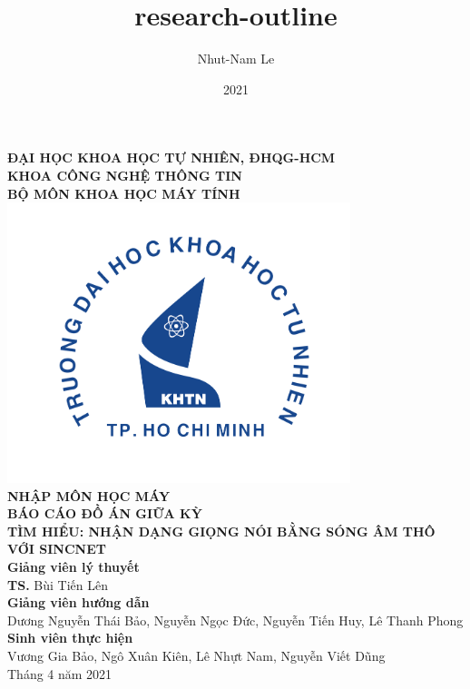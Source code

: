\documentclass{article}
\title{research-outline}
\author{Nhut-Nam Le}
\date{2021}
\newcommand\B{\rule[-1.2ex]{0pt}{0pt}} %
\begin{document}
	\begin{titlepage}
		\begin{center}
			\large{\textbf{ĐẠI HỌC KHOA HỌC TỰ NHIÊN, ĐHQG-HCM\\KHOA CÔNG NGHỆ THÔNG TIN\\BỘ MÔN KHOA HỌC MÁY TÍNH}}\\
			\includegraphics[width=0.75\textwidth]{images/khtn.png}\\
			\large \textbf{NHẬP MÔN HỌC MÁY}\\[0.1in]
			\huge \textbf{BÁO CÁO ĐỒ ÁN GIỮA KỲ}\\[0.1in]
			\huge \textbf{TÌM HIỂU: NHẬN DẠNG GIỌNG NÓI BẰNG SÓNG ÂM THÔ VỚI SINCNET}\\[0.1in]
			\vfill
			\normalsize
			\normalsize
			\textbf{Giảng viên lý thuyết}\\
			{\textbf{TS.} Bùi Tiến Lên}\\[0.1in]
			\textbf{Giảng viên hướng dẫn}\\
			\vspace{0.1in}
			{Dương Nguyễn Thái Bảo, Nguyễn Ngọc Đức, Nguyễn Tiến Huy, Lê Thanh Phong}\\[0.1in]
			\textbf{Sinh viên thực hiện} \\
			\vspace{0.1in}
			{Vương Gia Bảo, Ngô Xuân Kiên, Lê Nhựt Nam, Nguyễn Viết Dũng}\\[0.1in]
			\vfill
			Tháng 4 năm 2021
		\end{center}
	\end{titlepage}
	\newpage
	
	\cleardoublepage
\end{document}
